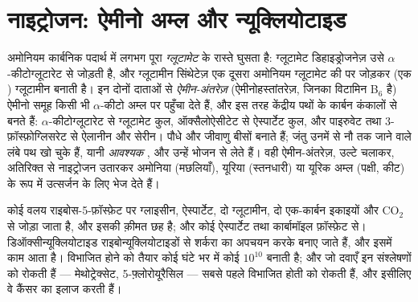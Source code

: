 \section{नाइट्रोजन: ऐमीनो अम्ल और न्यूक्लियोटाइड}

\begin{definition}\label{def:b1:biosyntheses-integration:nitrogen}
अमोनियम कार्बनिक पदार्थ में लगभग पूरा
\emph{ग्लूटामेट} के रास्ते घुसता है: ग्लूटामेट डिहाइड्रोजनेज़ उसे
$\alpha$-कीटोग्लूटारेट से जोड़ती है, और ग्लूटामीन सिंथेटेज़ एक दूसरा
अमोनियम ग्लूटामेट की  पर जोड़कर (एक ) ग्लूटामीन बनाती है।
इन दोनों दाताओं से \emph{ऐमीन-अंतरेज़} (ऐमीनोहस्तांतरेज़, जिनका 
विटामिन B$_6$ है) ऐमीनो समूह किसी भी $\alpha$-कीटो अम्ल पर पहुँचा देते
हैं, और इस तरह केंद्रीय पथों के कार्बन कंकालों से  बनते हैं:
$\alpha$-कीटोग्लूटारेट से ग्लूटामेट कुल, ऑक्सैलोऐसीटेट से ऐस्पार्टेट
कुल, और पाइरुवेट तथा 3-फ़ॉस्फ़ोग्लिसरेट से ऐलानीन और सेरीन। पौधे और
जीवाणु बीसों बनाते हैं; जंतु उनमें से नौ तक जाने वाले लंबे पथ खो चुके हैं,
यानी \emph{आवश्यक} , और उन्हें भोजन से लेते हैं। वही
ऐमीन-अंतरेज़, उल्टे चलाकर, अतिरिक्त  से नाइट्रोजन उतारकर
अमोनिया (मछलियाँ), यूरिया (स्तनधारी) या यूरिक अम्ल (पक्षी, कीट) के रूप
में उत्सर्जन के लिए भेज देते हैं।
\end{definition}

\begin{example}[न्यूक्लियोटाइड]\label{ex:b1:biosyntheses-integration:nucleotides}
कोई  वलय राइबोस-5-फ़ॉस्फ़ेट पर ग्लाइसीन,
ऐस्पार्टेट, दो ग्लूटामीन, दो एक-कार्बन इकाइयों और $\mathrm{CO_2}$ से जोड़ा
जाता है, और इसकी क़ीमत छह  है; और कोई  ऐस्पार्टेट तथा
कार्बामॉइल फ़ॉस्फ़ेट से। डिऑक्सीन्यूक्लियोटाइड राइबोन्यूक्लियोटाइडों से
शर्करा का अपचयन करके बनाए जाते हैं, और इसमें  काम आता है। विभाजित
होने को तैयार कोई  घंटे भर में कोई $10^{10}$
 बनाती है; और जो दवाएँ इन संश्लेषणों को रोकती हैं ---
मेथोट्रेक्सेट, 5-फ़्लोरोयूरैसिल --- सबसे पहले विभाजित होती  को
रोकती हैं, और इसीलिए वे कैंसर का इलाज करती हैं।
\end{example}

